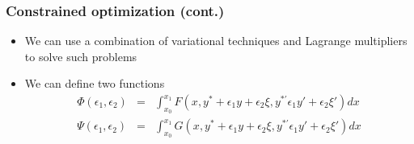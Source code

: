 \documentclass[10pt]{beamer}
\begin{document}
\begin{frame}
  \frametitle{Constrained optimization (cont.)}
  \begin{itemize}
  \item We can use a combination of variational techniques and Lagrange multipliers to solve such problems
  \item We can define two functions
    \[
      \begin{array}{rcl}
        \Phi(\epsilon_1,\epsilon_2) & = & \int_{x_0}^{x_1} F(x, y^{*} + \epsilon_1 y + \epsilon_2 \xi, y^{*'} \epsilon_1 y' + \epsilon_2 \xi {'}) dx\\
        \Psi(\epsilon_1,\epsilon_2) & = & \int_{x_0}^{x_1} G(x, y^{*} + \epsilon_1 y + \epsilon_2 \xi, y^{*'} \epsilon_1 y' + \epsilon_2 \xi {'}) dx\\
      \end{array}
    \]
  \end{itemize}
\end{frame}
\end{document}
